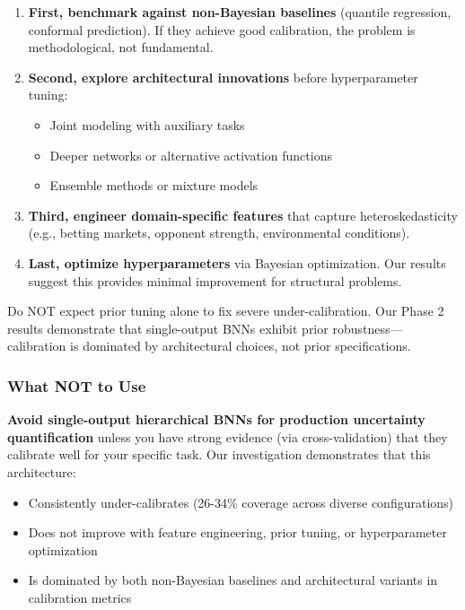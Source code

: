 \begin{enumerate}
    \item \textbf{First, benchmark against non-Bayesian baselines} (quantile regression, conformal prediction). If they achieve good calibration, the problem is methodological, not fundamental.

    \item \textbf{Second, explore architectural innovations} before hyperparameter tuning:
    \begin{itemize}
        \item Joint modeling with auxiliary tasks
        \item Deeper networks or alternative activation functions
        \item Ensemble methods or mixture models
    \end{itemize}

    \item \textbf{Third, engineer domain-specific features} that capture heteroskedasticity (e.g., betting markets, opponent strength, environmental conditions).

    \item \textbf{Last, optimize hyperparameters} via Bayesian optimization. Our results suggest this provides minimal improvement for structural problems.
\end{enumerate}

Do NOT expect prior tuning alone to fix severe under-calibration. Our Phase 2 results demonstrate that single-output BNNs exhibit prior robustness—calibration is dominated by architectural choices, not prior specifications.

\subsubsection{What NOT to Use}

\textbf{Avoid single-output hierarchical BNNs for production uncertainty quantification} unless you have strong evidence (via cross-validation) that they calibrate well for your specific task. Our investigation demonstrates that this architecture:

\begin{itemize}
    \item Consistently under-calibrates (26-34\% coverage across diverse configurations)
    \item Does not improve with feature engineering, prior tuning, or hyperparameter optimization
    \item Is dominated by both non-Bayesian baselines and architectural variants in calibration metrics
\end{itemize}

